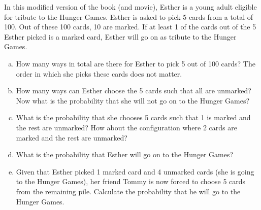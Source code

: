 \documentclass[]{article}
\newif\ifmotivation
\begin{document}
\begin{qunlist}
\ifmotivation
{\motivation {Motivation - Counting continued but d) is tricky.}}
\fi 


%
%



In this modified version of the book (and movie), Esther is a young adult eligible for tribute to the Hunger Games. Esther is asked to pick 5 cards from a total of 100. Out of these 100 cards, 10 are marked. If at least 1 of the cards out of the 5 Esther picked is a marked card, Esther will go on as tribute to the Hunger Games. 

\begin{enumerate}[a)]
  \qpart
\item How many ways in total are there for Esther to pick 5 out of 100 cards? The order in which she picks these cards does not matter. 
  
  \qpart
\item How many ways can Esther choose the 5 cards such that all are unmarked? Now what is the probability that she will not go on to the Hunger Games? 
  
  \qpart
\item What is the probability that she chooses 5 cards such that 1 is marked and the rest are unmarked? How about the configuration where 2 cards are marked and the rest are unmarked? 
  
  \qpart
\item What is the probability that Esther will go on to the Hunger Games? 
  
  \qpart
\item Given that Esther picked 1 marked card and 4 unmarked cards (she is going to the Hunger Games), her friend Tommy is now forced to choose 5 cards from the remaining pile. Calculate the probability that he will go to the Hunger Games. 
\end{enumerate}


\end{qunlist}
\end{document}
